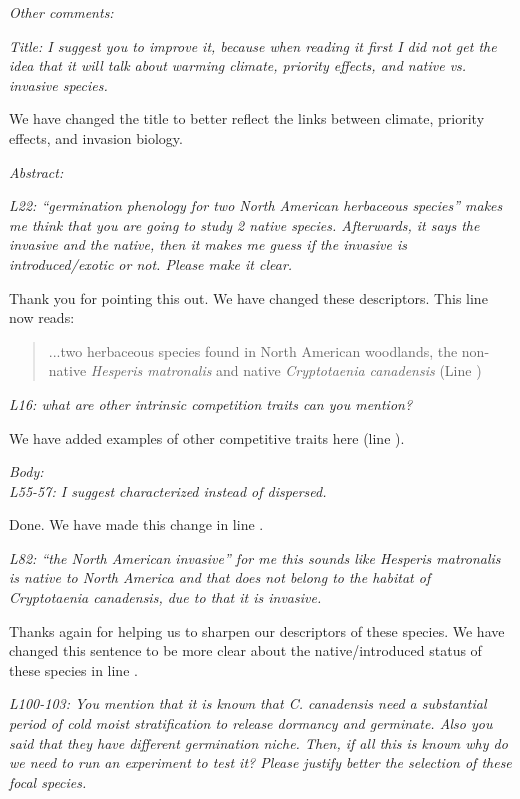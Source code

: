 \documentclass[11pt]{article}
\begin{document}
\emph{Other comments:}

\emph{Title: I suggest you to improve it, because when reading it first I did not get the idea that it will talk about warming climate, priority effects, and native vs. invasive species.}

We have changed the title to  better reflect the links between climate, priority effects, and invasion biology. 

\emph{ Abstract:} 

\emph{L22: “germination phenology for two North American herbaceous species” makes me think that you are going to study 2 native species. Afterwards, it says the invasive and the native, then it makes me guess if the invasive is introduced/exotic or not. Please make it clear.}

Thank you for pointing this out. We have changed these descriptors. This line now reads:
\begin{quote}...two herbaceous species found in North American woodlands, the non-native \textit{Hesperis matronalis} and native \textit{Cryptotaenia canadensis} (Line ) \end{quote}

\emph{L16: what are other intrinsic competition traits can you mention?}

We have added examples of other competitive traits here (line ). 

\emph{Body:}\\
\emph{L55-57: I suggest characterized instead of dispersed.}

Done. We have made this change in line .

\emph{L82: “the North American invasive” for me this sounds like Hesperis matronalis is native to North America and that does not belong to the habitat of Cryptotaenia canadensis, due to that it is invasive.}

Thanks again for helping us to sharpen our descriptors of these species. We have changed this sentence to be more clear about the native/introduced status of these species in line .

\emph{L100-103: You mention that it is known that C. canadensis need a substantial period of cold moist stratification to release dormancy and germinate. Also you said that they have different germination niche. Then, if all this is known why do we need to run an experiment to test it? Please justify better the selection of these focal species.}
\end{document}
